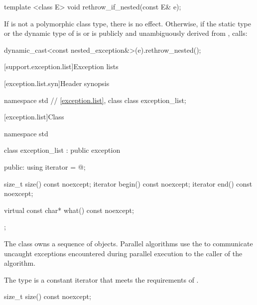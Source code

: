 \begin{itemdecl}
template <class E> void rethrow_if_nested(const E& e);
\end{itemdecl}

\begin{itemdescr}
\pnum
\effects
If  is not a polymorphic class type, there is no effect.
Otherwise, if the static type or the dynamic type of 
is  or is publicly and unambiguously derived from
, calls:
\begin{codeblock}
dynamic_cast<const nested_exception&>(e).rethrow_nested();
\end{codeblock}
\end{itemdescr}

[support.exception.list]{Exception lists}

[exception.list.syn]{Header  synopsis}

%
\begin{codeblock}
namespace std {
  // \ref{exception.list}, class 
  class exception_list;
}
\end{codeblock}

[exception.list]{Class }

\begin{codeblock}
namespace std {
  class exception_list : public exception {
  public:
    using iterator = @\unspec@;

    size_t size() const noexcept;
    iterator begin() const noexcept;
    iterator end() const noexcept;

    virtual const char* what() const noexcept;
  };
}
\end{codeblock}

\pnum
The class  owns a sequence of 
objects. Parallel algorithms use the  to communicate
uncaught exceptions encountered during parallel execution to the caller of the
algorithm.

\pnum
The type  is a constant iterator that meets the
requirements of .

\begin{itemdecl}
size_t size() const noexcept;
\end{itemdecl}

